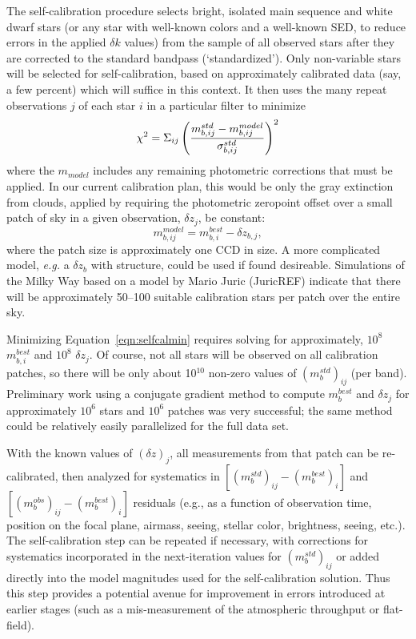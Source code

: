 \documentclass[12pt,preprint]{aastex}
\begin{document}
The self-calibration procedure selects bright, isolated main sequence
and white dwarf stars (or any star with well-known colors and a
well-known SED, to reduce errors in the applied
$\delta k$ values) from the sample of all observed stars after they are
corrected to the standard bandpass (`standardized'). Only non-variable stars will be
selected for self-calibration, based on approximately calibrated data
(say, a few percent) which will suffice in this context. It then uses
the many repeat observations $j$ of each star $i$ in a particular filter to minimize
\begin{equation}
\label{eqn:selfcalmin}
\chi^2 = \Sigma_{ij} \left(  { m_{b,ij}^{std} - m_{b,ij}^{model} \over
    \sigma_{b,ij}^{std} } \right)^2
\end{equation}
where the $m_{model}$ includes any remaining photometric corrections
that must be applied. In our current calibration plan, this would be only the
gray extinction from clouds, applied by requiring the photometric
zeropoint offset over a small patch of sky in a given observation, $\delta z_j$, be constant:
\begin{equation}
\label{eqn:zp}
m^{model}_{b,ij} = m^{best}_{b,i} - \delta z_{b,j},
\end{equation}
where the patch size is approximately one CCD in size. A more
complicated model, {\it e.g.} a $\delta z_{b}$ with structure, could
be used if found desireable. Simulations of the Milky Way based on a
model by Mario Juric (JuricREF) indicate that there will be
approximately 50--100 
suitable calibration stars per patch over the entire sky. 

Minimizing Equation~\ref{eqn:selfcalmin} requires solving for
approximately, $10^8$ $m_{b,i}^{best}$ and $10^8$ $\delta z_j$. Of
course, not all stars will be observed on all calibration patches, so
there will be only about 10$^{10}$ non-zero values of
$(m_b^{std})_{ij}$ (per band). Preliminary work using a conjugate
gradient method to compute $m_{b}^{best}$ and $\delta z_j$ for
approximately $10^6$ stars and $10^6$ patches was very successful; the
same method could be relatively easily parallelized for the full data
set. 

With the known values of $(\delta z)_j$, all measurements from that
patch can be re-calibrated, then analyzed for systematics in
$[(m_b^{std})_{ij} - (m_b^{best})_{i}]$ and $[(m_b^{obs})_{ij} -
(m_b^{best})_{i}]$ residuals (e.g., as a function of observation time,
position on the focal plane, airmass, seeing, stellar color,
brightness, seeing, etc.). The self-calibration step can be repeated
if necessary, with corrections for systematics incorporated in the
next-iteration values for $(m_b^{std})_{ij}$ or added directly into
the model magnitudes used for the self-calibration solution. Thus this
step provides a potential avenue for improvement in errors introduced
at earlier stages (such as a mis-measurement of the atmospheric
throughput or flat-field). 
\end{document}
